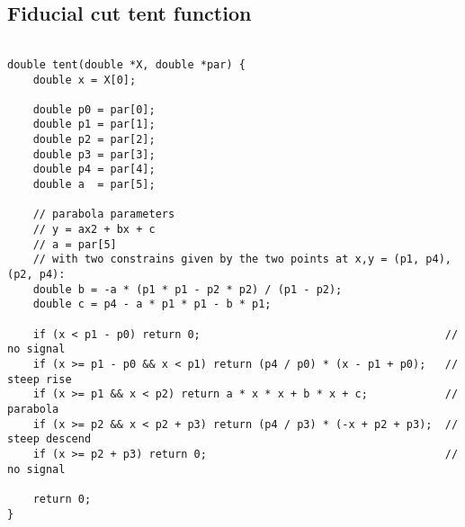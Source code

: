 \subsection{ Fiducial cut tent function}\label{sec:tent_function}

\begin{verbatim}

double tent(double *X, double *par) {
    double x = X[0];

    double p0 = par[0];
    double p1 = par[1];
    double p2 = par[2];
    double p3 = par[3];
    double p4 = par[4];
    double a  = par[5];

    // parabola parameters
    // y = ax2 + bx + c
    // a = par[5]
    // with two constrains given by the two points at x,y = (p1, p4), (p2, p4):
    double b = -a * (p1 * p1 - p2 * p2) / (p1 - p2);
    double c = p4 - a * p1 * p1 - b * p1;

    if (x < p1 - p0) return 0;                                      // no signal
    if (x >= p1 - p0 && x < p1) return (p4 / p0) * (x - p1 + p0);   // steep rise
    if (x >= p1 && x < p2) return a * x * x + b * x + c;            // parabola
    if (x >= p2 && x < p2 + p3) return (p4 / p3) * (-x + p2 + p3);  // steep descend
    if (x >= p2 + p3) return 0;                                     // no signal

    return 0;
}
\end{verbatim}